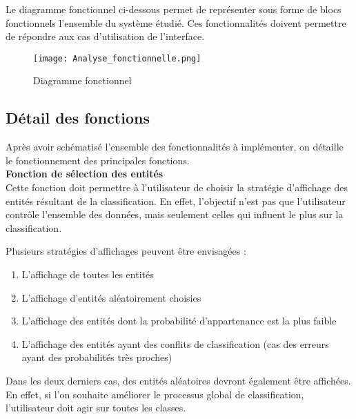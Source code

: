 Le diagramme fonctionnel ci-dessous permet de représenter sous forme de blocs fonctionnels l'ensemble du système étudié. Ces fonctionnalités doivent permettre de répondre aux cas d'utilisation de l'interface.

\begin{figure}[H]
	\begin{center}
		\texttt{[image: Analyse\_fonctionnelle.png]}  \\
		\caption[Diagramme fonctionnel]{Diagramme fonctionnel}
		\label{fig:fonction}
	\end{center}
\end{figure}

\subsection{Détail des fonctions}

Après avoir schématisé l'ensemble des fonctionnalités à implémenter, on détaille le fonctionnement des principales fonctions.\\

\noindent\textbf{Fonction de sélection des entités}\\

Cette fonction doit permettre à l’utilisateur de choisir la stratégie d’affichage des entités résultant de la classification. En effet, l’objectif n’est pas que l’utilisateur contrôle l’ensemble des données, mais seulement celles qui influent le plus sur la classification.\newline

\noindent Plusieurs stratégies d’affichages peuvent être envisagées :
\begin{enumerate}
	\item L’affichage de toutes les entités
	\item L'affichage d'entités aléatoirement choisies
	\item L’affichage des entités dont la probabilité d’appartenance est la plus faible
	\item L’affichage des entités ayant des conflits de classification (cas des erreurs ayant des probabilités très proches)
\end{enumerate}

Dans les deux derniers cas, des entités aléatoires devront également être affichées. En effet, si l’on souhaite améliorer le processus global de classification, l’utilisateur doit agir sur toutes les classes.\\ 

